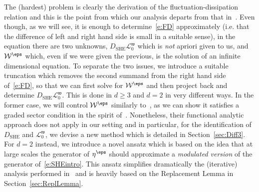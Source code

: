 \documentclass[reqno,11pt]{preprint}
\newcommand{\cL}{\mathcal{L}}
\newcommand{\cW}{\mathcal{W}}
\newcommand{\fw}{\mathfrak{w}}
\newcommand{\1}{\mathds{1}}
\newcommand{\SHE}{\mathrm{SHE}}
\newcommand{\gensy}{\cL_0}
\begin{document}
The (hardest) problem is clearly the derivation of the fluctuation-dissipation relation and 
this is the point from which our analysis departs from that in~\cite{Komorowski2012}. 
Even though, as we will see, it is enough to determine~\eqref{e:FD} approximately (i.e. that the difference 
of left and right hand side is small in a suitable sense), in the equation there are two unknowns, 
$D_\SHE\gensy^\fw$ which is {\it not} apriori given to us, and 
$\cW^\eps$ which, even if we were given the previous, is the solution of an infinite dimensional equation. 
To separate the two issues, we introduce a suitable truncation which removes the second 
summand from the right hand side of~\eqref{e:FD}, so that we can first solve for $\cW^\eps$ and 
then project back and determine $D_\SHE\gensy^\fw$. 
This is done in $d\geq 3$ and $d=2$ in very different ways. In the former case, we will control 
$\cW^\eps$ similarly to~\cite{LY}, as we can show it satisfies a graded sector condition 
in the spirit of~\cite[Section 2.7.4]{Komorowski2012}. Nonetheless, 
their functional analytic approach does not apply in our setting and in particular, for the identification 
of $D_\SHE$ and $\gensy^\fw$, we devise a new method which is detailed in Section~\ref{sec:Diff3}. 
For $d=2$ instead, we introduce a novel ansatz which is based on the idea that at large scales 
the generator of $\eta^\eps$ should approximate a {\it modulated version} of the generator of~\eqref{e:SHEintro}. 
This ansatz simplifies dramatically the (iterative) analysis performed in~\cite{CETWeak} and 
is heavily based on the Replacement Lemma in Section~\ref{sec:ReplLemma}. 


%
%
%
\end{document}

